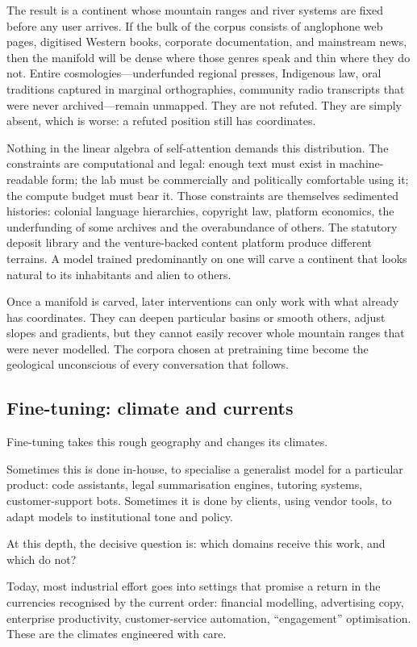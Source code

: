 The result is a continent whose mountain ranges and river systems are fixed before any user arrives. If the bulk of the corpus consists of anglophone web pages, digitised Western books, corporate documentation, and mainstream news, then the manifold will be dense where those genres speak and thin where they do not. Entire cosmologies---underfunded regional presses, Indigenous law, oral traditions captured in marginal orthographies, community radio transcripts that were never archived---remain unmapped. They are not refuted. They are simply absent, which is worse: a refuted position still has coordinates.

Nothing in the linear algebra of self-attention demands this distribution. The constraints are computational and legal: enough text must exist in machine-readable form; the lab must be commercially and politically comfortable using it; the compute budget must bear it. Those constraints are themselves sedimented histories: colonial language hierarchies, copyright law, platform economics, the underfunding of some archives and the overabundance of others. The statutory deposit library and the venture-backed content platform produce different terrains. A model trained predominantly on one will carve a continent that looks natural to its inhabitants and alien to others.

Once a manifold is carved, later interventions can only work with what already has coordinates. They can deepen particular basins or smooth others, adjust slopes and gradients, but they cannot easily recover whole mountain ranges that were never modelled. The corpora chosen at pretraining time become the geological unconscious of every conversation that follows.

\subsection{Fine-tuning: climate and currents}

Fine-tuning takes this rough geography and changes its climates.

Sometimes this is done in-house, to specialise a generalist model for a particular product: code assistants, legal summarisation engines, tutoring systems, customer-support bots. Sometimes it is done by clients, using vendor tools, to adapt models to institutional tone and policy.

At this depth, the decisive question is: which domains receive this work, and which do not?

Today, most industrial effort goes into settings that promise a return in the currencies recognised by the current order: financial modelling, advertising copy, enterprise productivity, customer-service automation, ``engagement'' optimisation. These are the climates engineered with care.

